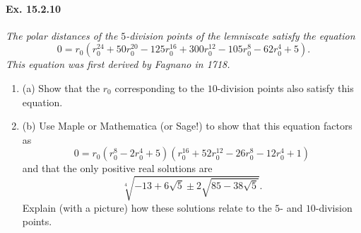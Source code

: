 \documentclass[11pt,a4paper]{article}
\newcommand{\be} {\begin{enumerate}}
\newcommand{\ee} {\end{enumerate}}
\begin{document}
\paragraph{Ex. 15.2.10}{\it The polar distances of the $5$-division points of the lemniscate satisfy the equation
$$0 = r_0(r_0^{24} + 50 r_0^{20} - 125 r_0^{16} + 300 r_0^{12} - 105 r_0^8 - 62 r_0^4 + 5).$$
This equation was first derived by Fagnano in 1718.
\be
\item[(a)] Show that the $r_0$ corresponding to the $10$-division points also satisfy this equation.
\item[(b)] Use Maple or Mathematica (or Sage!) to show that this equation factors as
$$0 = r_0(r_0^8 - 2 r_0^4 + 5)(r_0^{16}+52r_0^{12} - 26 r_0^8 - 12 r_0^4 + 1)$$
and that the only positive real solutions are
$$\sqrt[4]{-13 + 6 \sqrt{5} \pm 2 \sqrt{85-38 \sqrt{5}}}.$$
Explain (with a picture) how these solutions relate to the $5$- and $10$-division points.
\ee
}
\end{document}
